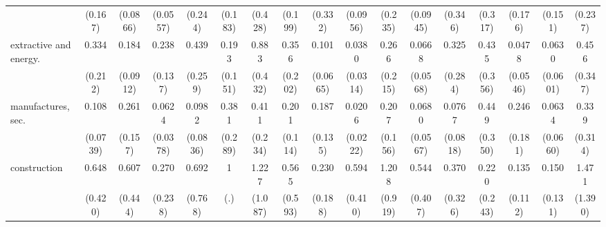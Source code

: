 {\begin{tabular}{l*{16}{c}}
                    &     (0.167)         &    (0.0866)         &    (0.0557)         &     (0.244)         &     (0.183)         &     (0.428)         &     (0.199)         &     (0.332)         &    (0.0956)         &     (0.235)         &    (0.0945)         &     (0.346)         &     (0.317)         &     (0.176)         &     (0.151)         &     (0.237)         \\
[1em]
extractive and energy.&       0.334         &       0.184\sym{***}&       0.238\sym{*}  &       0.439         &       0.193\sym{*}  &       0.883         &       0.356         &       0.101\sym{***}&      0.0380\sym{***}&       0.266         &      0.0668\sym{**} &       0.325         &       0.435         &      0.0478\sym{**} &      0.0630\sym{**} &       0.456         \\
                    &     (0.212)         &    (0.0912)         &     (0.137)         &     (0.259)         &     (0.151)         &     (0.432)         &     (0.202)         &    (0.0665)         &    (0.0314)         &     (0.215)         &    (0.0568)         &     (0.284)         &     (0.356)         &    (0.0546)         &    (0.0601)         &     (0.347)         \\
[1em]
manufactures, sec.  &       0.108\sym{**} &       0.261\sym{*}  &      0.0624\sym{***}&      0.0982\sym{**} &       0.381         &       0.411         &       0.201\sym{**} &       0.187\sym{*}  &      0.0206\sym{***}&       0.207\sym{*}  &      0.0680\sym{**} &      0.0767\sym{*}  &       0.449         &       0.246         &      0.0634\sym{**} &       0.339         \\
                    &    (0.0739)         &     (0.157)         &    (0.0378)         &    (0.0836)         &     (0.289)         &     (0.234)         &     (0.114)         &     (0.135)         &    (0.0222)         &     (0.156)         &    (0.0567)         &    (0.0818)         &     (0.350)         &     (0.181)         &    (0.0660)         &     (0.314)         \\
[1em]
construction        &       0.648         &       0.607         &       0.270         &       0.692         &           1         &       1.227         &       0.565         &       0.230         &       0.594         &       1.208         &       0.544         &       0.370         &       0.220         &       0.135\sym{*}  &       0.150\sym{*}  &       1.471         \\
                    &     (0.420)         &     (0.444)         &     (0.238)         &     (0.768)         &         (.)         &     (1.087)         &     (0.593)         &     (0.188)         &     (0.410)         &     (0.919)         &     (0.407)         &     (0.326)         &     (0.243)         &     (0.112)         &     (0.131)         &     (1.390)         \\

\end{tabular}}
